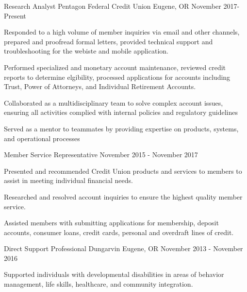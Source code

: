 
\begin{cventries}
  \cventry
    {Research Analyst} %
    {Pentagon Federal Credit Union} %
    {Eugene, OR} %
    {November 2017-Present} %
    {
      \begin{cvitems} %
        \item {Responded to a high volume of member inquiries via email and other channels, prepared and proofread formal letters, provided technical support and troubleshooting for the webiste and mobile application.}
        \item {Performed specialized and monetary account maintenance, reviewed credit reports to determine elgibility, processed applications for accounts including Trust, Power of Attorneys, and Individual Retirement Accounts.}
        \item {Collaborated as a multidisciplinary team to solve complex account issues, ensuring all activities complied with internal policies and regulatory guidelines}
        \item {Served as a mentor to teammates by providing expertise on products, systems, and operational processes}
         	\end{cvitems}
    } 

  \cventry
    {Member Service Representative} %
    {} %
    {} %
    {November 2015 - November 2017} %
    {
      \begin{cvitems} %
        \item {Presented and recommended Credit Union products and services to members to assist in meeting individual financial needs.}
        \item {Researched and resolved account inquiries to ensure the highest quality member service.}
        \item {Assisted members with submitting applications for membership, deposit accounts, consumer loans, credit cards, personal and overdraft lines of credit.}
         	\end{cvitems}
    } 
    
    \cventry
    {Direct Support Professional} %
    {Dungarvin} %
    {Eugene, OR} %
    {November 2013 - November 2016} %
    {
      \begin{cvitems} %
        \item {Supported individuals with developmental disabilities in areas of behavior management, life skills, healthcare, and community integration. }
      \end{cvitems}
    }     
    

\end{cventries}
